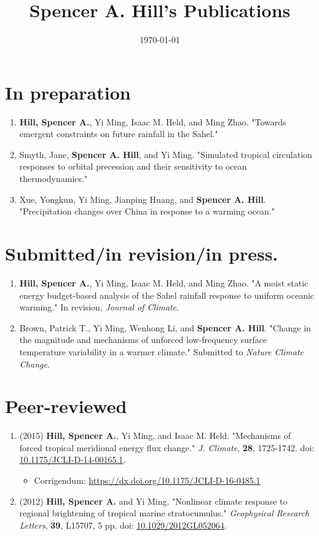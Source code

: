 \documentclass{article}
\date{\today}
\title{Spencer A. Hill's Publications}
\begin{document}
\maketitle
\section*{In preparation}
\label{sec:orgb99c50a}
\begin{enumerate}
\item \textbf{Hill, Spencer A.}, Yi Ming, Isaac M. Held, and Ming Zhao.  "Towards emergent
constraints on future rainfall in the Sahel."
\item Smyth, Jane, \textbf{Spencer A. Hill}, and Yi Ming.  "Simulated tropical circulation
responses to orbital precession and their sensitivity to ocean
thermodynamics."
\item Xue, Yongkun, Yi Ming, Jianping Huang, and \textbf{Spencer A. Hill}.  "Precipitation
changes over China in response to a warming ocean."
\end{enumerate}
\section*{Submitted/in revision/in press.}
\label{sec:org0ab10b3}
\begin{enumerate}
\item \textbf{Hill, Spencer A.}, Yi Ming, Isaac M. Held, and Ming Zhao.  "A moist static
energy budget-based analysis of the Sahel rainfall response to uniform
oceanic warming."  In revision, \emph{Journal of Climate}.
\item Brown, Patrick T., Yi Ming, Wenhong Li, and \textbf{Spencer A. Hill}.  "Change in the
magnitude and mechanisms of unforced low-frequency surface temperature
variability in a warmer climate."  Submitted to \emph{Nature Climate Change}.
\end{enumerate}
\section*{Peer-reviewed}
\label{sec:org7d2225a}
\begin{enumerate}
\item (2015) \textbf{Hill, Spencer A.}, Yi Ming, and Isaac M. Held. "Mechanisms of forced
tropical meridional energy flux change."  \emph{J. Climate}, \textbf{28}, 1725-1742.  doi:
\href{http://dx.doi.org/10.1175/JCLI-D-14-00165.1}{10.1175/JCLI-D-14-00165.1}.
\begin{itemize}
\item Corrigendum: \url{https://dx.doi.org/10.1175/JCLI-D-16-0485.1}
\end{itemize}
\item (2012) \textbf{Hill, Spencer A.} and Yi Ming. "Nonlinear climate response to regional
brightening of tropical marine stratocumulus."  \emph{Geophysical Research Letters},
\textbf{39}, L15707, 5 pp. doi: \href{http://dx.doi.org/10.1029/2012GL052064}{10.1029/2012GL052064}.
\end{enumerate}
\end{document}
